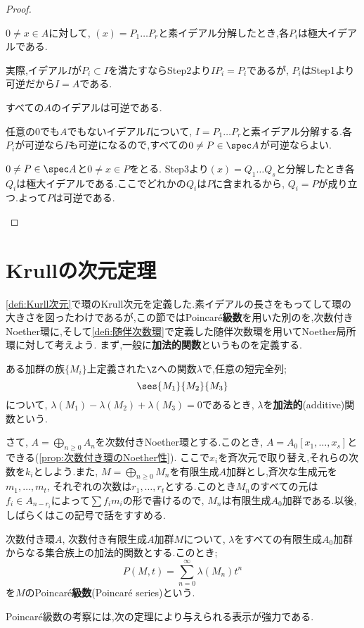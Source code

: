 \begin{proof}
\begin{step}
		\item $0\neq x\in A$に対して, $(x)=P_1\dots P_r$と素イデアル分解したとき,各$P_i$は極大イデアルである.
		
		実際,イデアル$I$が$P_i\subset I$を満たすならStep2より$IP_i=P_i$であるが, $P_i$はStep1より可逆だから$I=A$である.
		
		\item すべての$A$のイデアルは可逆である.
		
		任意の0でも$A$でもないイデアル$I$について, $I=P_1\dots P_r$と素イデアル分解する.各$P_i$が可逆なら$I$も可逆になるので,すべての$0\neq P\in\spec A$が可逆ならよい.
		
		$0\neq P\in\spec A$と$0\neq x\in P$をとる. Step3より$(x)=Q_1\dots Q_s$と分解したとき各$Q_i$は極大イデアルである.ここでどれかの$Q_i$は$P$に含まれるから, $Q_i=P$が成り立つ.よって$P$は可逆である.
	\end{step}
\end{proof}

\section{Krullの次元定理}
\ref{defi:Kurll次元}で環のKrull次元を定義した.素イデアルの長さをもってして環の大きさを図ったわけであるが,この節ではPoincar\'e\textbf{級数}を用いた別のを,次数付きNoether環に,そして\ref{defi:随伴次数環}で定義した随伴次数環を用いてNoether局所環に対して考えよう.
まず,一般に\textbf{加法的関数}というものを定義する.
\begin{defi}[加法的関数]
	ある加群の族$\{M_i\}$上定義された$\Z$への関数$\lambda$で,任意の短完全列;
	\[\ses{M_1}{M_2}{M_3}\]
	について, $\lambda(M_1)-\lambda(M_2)+\lambda(M_3)=0$であるとき, $\lambda$を\textbf{加法的}(additive)関数という.
\end{defi}

さて, $A=\bigoplus_{n\geq0}A_n$を次数付きNoether環とする.このとき, $A=A_0[x_1,\dots,x_s]$とできる(\ref{prop:次数付き環のNoether性}). ここで$x_i$を斉次元で取り替え,それらの次数を$k_i$としよう.また, $M=\bigoplus_{n\geq0}M_n$を有限生成$A$加群とし,斉次な生成元を$m_1,\dots,m_t$, それぞれの次数は$r_1,\dots,r_t$とする.このとき$M_n$のすべての元は$f_i\in A_{n-r_i}$によって$\sum f_im_i$の形で書けるので, $M_n$は有限生成$A_0$加群である.以後,しばらくはこの記号で話をすすめる.

\begin{defi}
	次数付き環$A$, 次数付き有限生成$A$加群$M$について, $\lambda$をすべての有限生成$A_0$加群からなる集合族上の加法的関数とする.このとき;
	\[P(M,t)=\sum_{n=0}^\infty \lambda(M_n)t^n\]
	を$M$のPoincar\'e\textbf{級数}(Poincar\'e series)という.
\end{defi}
Poincar\'e級数の考察には,次の定理により与えられる表示が強力である.

